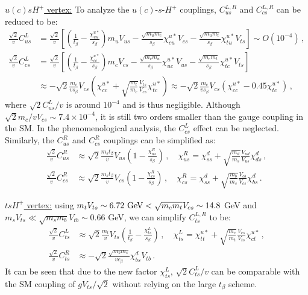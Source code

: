 \documentclass[prd,preprint,superscriptaddress,amsmath,amssymb]{revtex4}
\begin{document}
  \underline {$ u(c) s H^+$ vertex:}  To analyze the $u(c)$-$s$-$H^+$ couplings,   $C^{L,R}_{us}$ and $C^{L,R}_{cs}$ can be reduced to be:
  \begin{align}
 \frac{\sqrt{2}}{v}  C^L_{us} & = \frac{\sqrt{2}}{v} \left[\left(  \frac{1}{ t_\beta }  - \frac{\chi^{u*}_{uu}}{ s_\beta}\right)  m_u V_{u s}  - \frac{\sqrt{m_u m_c}}{s_\beta} \chi^{u*}_{cu} V_{cs}  - \frac{\sqrt{m_u m_t}}{s_\beta} \chi^{u*}_{tu} V_{ts}\right] \sim O(10^{-4})\,,\\
\frac{\sqrt{2}}{v}  C^L_{cs} & = \frac{\sqrt{2}}{v} \left[ \left(\frac{1}{t_\beta} -\frac{\chi^{u*}_{cc}}{s_\beta} \right) m_c V_{cs} - \frac{\sqrt{m_c m_u}}{s_\beta} \chi^{u*}_{uc} V_{us} - \frac{\sqrt{m_c m_t}}{s_\beta} \chi^{u*}_{tc} V_{ts}\right] \nonumber \\
 & \approx - \sqrt{2} \frac{m_c}{v s_\beta} V_{cs} \left(\chi^{u*}_{cc} +  \sqrt{\frac{m_t}{m_c}} \frac{V_{ts}}{V_{cs}} \chi^{u*}_{tc} \right) \approx  - \sqrt{2} \frac{m_c}{v s_\beta} V_{cs} ( \chi^{u*}_{cc} - 0.45 \chi^{u*}_{tc}) \,,
  \end{align}
  where $\sqrt{2}C^L_{us}/v$ is around $10^{-4}$ and is thus  negligible. Although $\sqrt{2} m_c/v V_{cs}\sim 7.4 \times 10^{-4}$, it is still two orders smaller than the gauge coupling in the SM.  In the phenomenological analysis, the $C^L_{cs}$ effect can be neglected. Similarly, the $C^R_{us}$ and $C^R_{cs}$ couplings can be simplified as:
   \begin{align}
 \frac{\sqrt{2}}{v}  C^R_{us} & \approx \sqrt{2} \frac{m_s t_\beta}{v} V_{us} \left(1 - \frac{\chi^R_{us}}{s_\beta} \right)\,, \quad \chi^R_{us} =  \chi^d_{ss} + \sqrt{\frac{m_d}{m_s}} \frac{V_{ud}}{V_{us}} \chi^d_{ds}\,,  \\
  \frac{\sqrt{2}}{v}  C^R_{cs} & \approx \sqrt{2} \frac{m_s t_\beta}{v} V_{cs} \left(1 - \frac{\chi^R_{cs}}{s_\beta} \right)\,, \quad \chi^R_{cs} = \chi^d_{ss} + \sqrt{\frac{m_b}{m_s}} \frac{V_{cb}}{V_{cs}} \chi^d_{bs}\,.
   \end{align}
 
 \underline {$ t s H^+$ vertex:}   using $m_t V_{ts} \sim 6.72 \ {\rm GeV} < \sqrt{m_c m_t} V_{cs} \sim 14.8$ GeV and   $ m_s V_{ts} \ll \sqrt{m_s m_b} V_{tb} \sim 0.66$ GeV, we can simplify $C^{L,R}_{ts}$ to be:
  \begin{align}
\frac{\sqrt{2}}{v}  C^L_{ts} & \approx \sqrt{2} \frac{m_t}{v} V_{ts} \left( \frac{1}{t_\beta} - \frac{\chi^L_{ts}}{s_\beta}\right)\,, \quad \chi^L_{ts} = \chi^{u*}_{tt} + \sqrt{\frac{m_c}{m_t}} \frac{V_{cs}}{V_{ts}} \chi^{u*}_{ct}\,, \label{eq:CLts} \\
 \frac{\sqrt{2}}{v} C^R_{ts} & \approx  -\sqrt{2} \frac{\sqrt{m_b m_s}}{v c_\beta} \chi^d_{bs} V_{tb}\,. \nonumber 
  \end{align}
It can be seen that due to the new factor $\chi^L_{ts}$, $\sqrt{2}C^L_{ts}/v$ can be comparable with the SM coupling of $g V_{ts}/\sqrt{2}$ without relying on the large $t_\beta$ scheme. 
\end{document}
